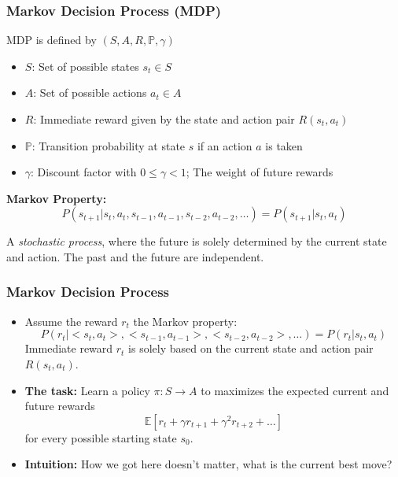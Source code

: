 \documentclass[aspectratio=169, 10pt]{beamer}
\begin{document}
\begin{frame}[t]
\frametitle{Markov Decision Process (MDP)}
MDP is defined by $(S, A, R, \mathbb{P}, \gamma)$
\begin{itemize}
    \item $S$: Set of possible states $s_t \in S$
    \item $A$: Set of possible actions $a_t \in A$
    \item $R$: Immediate reward given by the state and action pair $R(s_t, a_t)$
    \item $\mathbb{P}$: Transition probability at state $s$ if an action $a$ is taken
    \item $\gamma$: Discount factor with $0 \leq \gamma < 1$; The weight of future rewards
\end{itemize}

\textbf{Markov Property:} 
\[
    P(s_{t+1}|s_t, a_t, s_{t-1}, a_{t-1}, s_{t-2}, a_{t-2}, \ldots) = P(s_{t+1}|s_t, a_t)
\]

A \textit{stochastic process}, where the future is solely determined by the current state and action. The past and the future are independent.

\end{frame}

\begin{frame}[t]
\frametitle{Markov Decision Process}

\begin{itemize}
    \item Assume the reward $r_t$ the Markov property:
    \[
        P(r_t|<s_t, a_t>, <s_{t-1}, a_{t-1}>, <s_{t-2}, a_{t-2}>, \ldots) = P(r_t|s_t, a_t)
    \]
    Immediate reward $r_t$ is solely based on the current state and action pair $R(s_t, a_t)$.
    \item \textbf{The task:} Learn a policy $\pi: S \to A$ to maximizes the expected current and future rewards
    \[
        \mathbb{E}[r_t + \gamma r_{t+1} + \gamma^2 r_{t+2} + \ldots]
    \]
    for every possible starting state $s_0$.
    \item \textbf{Intuition:} How we got here doesn’t matter, what is the current best move?
\end{itemize}

\end{frame}
\end{document}
